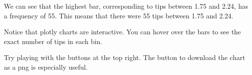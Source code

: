 \documentclass[
  letterpaper,
  DIV=11,
  numbers=noendperiod]{scrreprt}
\begin{document}
We can see that the highest bar, corresponding to tips between 1.75 and
2.24, has a frequency of 55. This means that there were 55 tips between
1.75 and 2.24.

\begin{tcolorbox}[enhanced jigsaw, colframe=quarto-callout-note-color-frame, opacityback=0, titlerule=0mm, bottomrule=.15mm, breakable, leftrule=.75mm, colbacktitle=quarto-callout-note-color!10!white, title=\textcolor{quarto-callout-note-color}{\faInfo}\hspace{0.5em}{Side-note}, rightrule=.15mm, coltitle=black, opacitybacktitle=0.6, colback=white, left=2mm, arc=.35mm, toptitle=1mm, bottomtitle=1mm, toprule=.15mm]

Notice that plotly charts are interactive. You can hover over the bars
to see the exact number of tips in each bin.

Try playing with the buttons at the top right. The button to download
the chart as a png is especially useful.

\end{tcolorbox}
\end{document}

